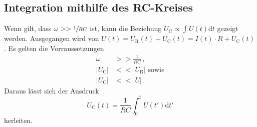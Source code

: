 \subsection{Integration mithilfe des RC-Kreises}
Wenn gilt, dass $\omega >>\sfrac{1}{RC}$ ist, kann die Beziehung
$U_\text{C}\propto\int U(t)\text{d}t$ gezeigt werden. Ausgegangen wird von
$U(t)=U_\text{R}(t)+U_\text{C}(t)=I(t)\cdot R+U_\text{C}(t)$.
Es gelten die Vorraussetzungen
\begin{align}
    \omega &>>\frac{1}{RC}\,,\\
    |U_\text{C}|&<<|U_\text{R}|\text{ sowie}\\
    |U_\text{C}|&<<|U|\,.
\end{align}
Daraus lässt sich der Ausdruck
\begin{equation}
    U_\text{C}(t)=\frac{1}{RC}\int_0^t U(t')\text{d}t'
\end{equation}
herleiten.